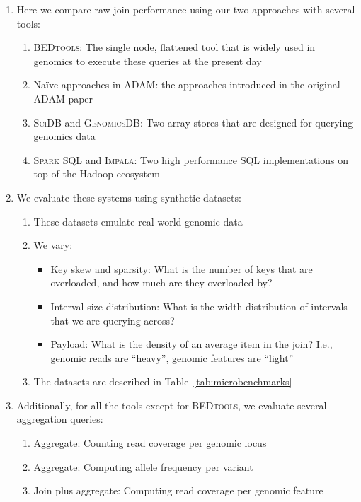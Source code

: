 \documentclass{vldb}
\begin{document}
\begin{enumerate}
\item Here we compare raw join performance using our two approaches with
several tools:
\begin{enumerate}
\item \textsc{BEDtools}: The single node, flattened tool that is widely
used in genomics to execute these queries at the present day~\cite{quinlan10}
\item Na\"{i}ve approaches in \textsc{ADAM}: the approaches introduced
in the original \textsc{ADAM} paper~\cite{nothaft15}
\item \textsc{SciDB} and \textsc{GenomicsDB}: Two array stores that are
designed for querying genomics data~\cite{brown10, taft14, papadopoulos16}
\item \textsc{Spark SQL} and \textsc{Impala}: Two high performance SQL
implementations on top of the Hadoop ecosystem~\cite{armbrust15, kornacker15}
\end{enumerate}
\item We evaluate these systems using synthetic datasets:
\begin{enumerate}
\item These datasets emulate real world genomic data
\item We vary:
\begin{itemize}
\item Key skew and sparsity: What is the number of keys that are overloaded,
and how much are they overloaded by?
\item Interval size distribution: What is the width distribution of intervals
that we are querying across?
\item Payload: What is the density of an average item in the join? I.e., genomic
reads are ``heavy'', genomic features are ``light''
\end{itemize}
\item The datasets are described in Table~\ref{tab:microbenchmarks}
\end{enumerate}
\item Additionally, for all the tools except for \textsc{BEDtools}, we evaluate
several aggregation queries:
\begin{enumerate}
\item Aggregate: Counting read coverage per genomic locus
\item Aggregate: Computing allele frequency per variant
\item Join plus aggregate: Computing read coverage per genomic feature
\end{enumerate}
\end{enumerate}
\end{document}
